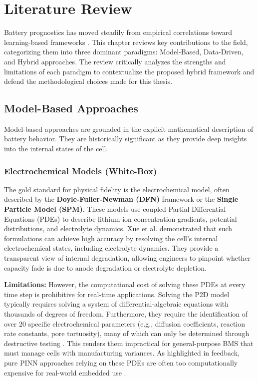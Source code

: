 \chapter{Literature Review}
\label{ch:literature}

Battery prognostics has moved steadily from empirical correlations toward learning-based frameworks \cite{berecibar_review}. This chapter reviews key contributions to the field, categorizing them into three dominant paradigms: Model-Based, Data-Driven, and Hybrid approaches. The review critically analyzes the strengths and limitations of each paradigm to contextualize the proposed hybrid framework and defend the methodological choices made for this thesis.

\section{Model-Based Approaches}

Model-based approaches are grounded in the explicit mathematical description of battery behavior. They are historically significant as they provide deep insights into the internal states of the cell.

\subsection{Electrochemical Models (White-Box)}

The gold standard for physical fidelity is the electrochemical model, often described by the \textbf{Doyle-Fuller-Newman (DFN)} framework or the \textbf{Single Particle Model (SPM)}. These models use coupled Partial Differential Equations (PDEs) to describe lithium-ion concentration gradients, potential distributions, and electrolyte dynamics. Xue et al. \cite{wang_pinn} demonstrated that such formulations can achieve high accuracy by resolving the cell's internal electrochemical states, including electrolyte dynamics. They provide a transparent view of internal degradation, allowing engineers to pinpoint whether capacity fade is due to anode degradation or electrolyte depletion.

\textbf{Limitations:} However, the computational cost of solving these PDEs at every time step is prohibitive for real-time applications. Solving the P2D model typically requires solving a system of differential-algebraic equations with thousands of degrees of freedom. Furthermore, they require the identification of over 20 specific electrochemical parameters (e.g., diffusion coefficients, reaction rate constants, pore tortuosity), many of which can only be determined through destructive testing \cite{unmeasurable_states}. This renders them impractical for general-purpose BMS that must manage cells with manufacturing variances. As highlighted in feedback, pure PINN approaches relying on these PDEs are often too computationally expensive for real-world embedded use \cite{ref1_general}.

